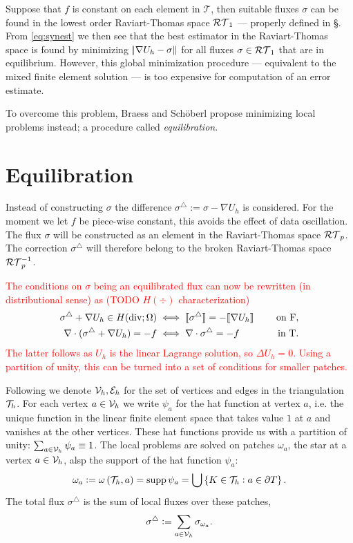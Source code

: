 \documentclass[thesis.tex]{subfiles}
\begin{document}
Suppose that $f$ is constant on each element in $\mathcal{T}$, then suitable fluxes $\sigma$ can be 
found in the lowest order Raviart-Thomas space $\mathcal{RT}_1$ --- properly defined in \S {}.
From \eqref{eq:synest} we then see that 
the best estimator in the Raviart-Thomas space is found by minimizing $\norm{\nabla U_h - \sigma}$ for all 
fluxes $\sigma \in \mathcal{RT}_1$ that are in equilibrium. However,
this global minimization procedure --- equivalent to the mixed finite element solution --- 
is too expensive for computation of an error estimate.

To overcome this problem, Braess and Sch\"oberl \cite{braessequil} propose minimizing local problems instead; a procedure
called \emph{equilibration}.

\section{Equilibration} 
Instead of constructing $\sigma$ the difference $\sigma^\triangle := \sigma - \nabla U_h$ is considered.
For the moment we let  $f$ be piece-wise constant, this avoids the effect of data oscillation.
The flux $\sigma$ will be constructed as an element in the 
Raviart-Thomas space $\mathcal{RT}_p$. The correction $\sigma^\triangle$ will therefore belong to the broken Raviart-Thomas space $\mathcal{RT}_p^{-1}$.

\textcolor{red}{
The conditions on $\sigma$ being an equilibrated flux can now be rewritten (in distributional sense) as (TODO $H(\div)$ characterization) 
\begin{alignat*}{2}
  \sigma^\triangle + \nabla U_h \in H(\operatorname{div}; \Omega) &\iff \llbracket \sigma^\triangle  \rrbracket = -\llbracket \nabla U_h \rrbracket & \quad \text{ on F},\\
  \nabla \cdot ( \sigma^\triangle + \nabla U_h) = -f &\iff \nabla \cdot \sigma^\triangle = -f & \quad \text{ in T}.
\end{alignat*}
The latter follows as $U_h$ is the linear Lagrange solution, so  $\Delta U_h = 0$. Using a partition of unity, this can be turned into
a set of conditions for smaller patches.
}

Following \cite{ernequil} we denote $\mathcal{V}_h, \mathcal{E}_h$ for the set of vertices and edges in the triangulation~$\mathcal{T}_h$. 
For each vertex $a \in \mathcal{V}_h$ we write $\psi_a$ for the hat function at vertex $a$, 
i.e. the unique function in the linear finite element space
that takes value $1$ at $a$ and vanishes at the other vertices.
These hat functions provide us with a partition of unity: $\sum_{a \in \mathcal{V}_h} \psi_a \equiv 1$.
The local problems are solved on patches $\omega_a$, the star at a vertex $a \in \mathcal{V}_h$, alsp the support of
the hat function $\psi_a$:
\[
  \omega_a := \omega\left( \mathcal{T}_h, a\right) = \operatorname{supp}{\psi_a} = \bigcup \set{ K \in \mathcal{T}_h : a \in \partial T}.
\]
The total flux $\sigma^\triangle$ is the sum of local fluxes over these patches, 
\[
  \sigma^\triangle := \sum_{a \in \mathcal{V}_h} \sigma_{\omega_a}.
\]
\end{document}
